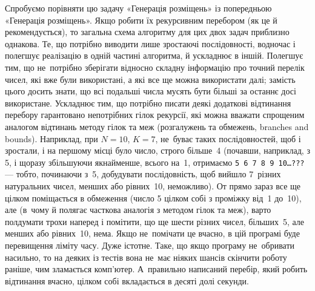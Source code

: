 Спробуємо порівняти цю задачу «Генерація розміщень» із попередньою «Генерація розміщень». 
Якщо робити їх рекурсивним перебором (як це й рекомендується), то загальна схема алгоритму для цих двох задач приблизно однакова. 
Те, що потрібно виводити лише зростаючі послідовності, водночас і полегшує реалізацію в одній частині  алгоритма, й ускладнює в іншій. Полегшує тим, що не~потрібно зберігати відносно складну інформацію про точний перелік чисел, які вже були використані, а які все ще можна використати далі; замість цього досить знати, що всі подальші числа мусять бути більші за останнє досі використане. Ускладнює тим, що потрібно писати деякі додаткові відтинання перебору гарантовано непотрібних гілок рекурсії, які можна вважати спрощеним аналогом відтинань методу гілок та меж (розгалужень та обмежень, branches and bounds). Наприклад, при $N=10$, $K=7$, не~буває таких послідовностей, щоб і зростали, і на першому місці було число, строго більше~4 (почавши, наприклад, з 5, і щоразу збільшуючи якнайменше, всього на~1, отримаємо \texttt{5~6~7~8~9~10\dots???} --- тобто, починаючи з~5, добудувати послідовність, щоб вийшло 7~різних натуральних чисел, менших або рівних~10, неможливо). От прямо зараз все ще цілком поміщається в обмеження (число 5 цілком собі з проміжку від~1 до~10), але (в~чому й полягає часткова аналогія з методом гілок та меж), варто полдумати трохи наперед і помітити, що ще шести різних чисел, більших~5, але менших або рівних~10, нема.  Якщо не~помічати це вчасно, в цій програмі буде перевищення ліміту часу. Дуже істотне. Таке, що якщо програму не~обривати насильно, то на деяких із тестів вона не~має ніяких шансів скінчити роботу раніше, чим зламається комп'ютер. А~правильно написаний перебір, який робить відтинання вчасно, цілком собі вкладається в десяті долі секунди.